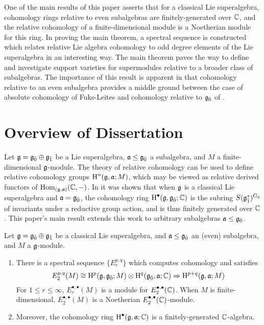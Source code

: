 One of the main results of this paper asserts that for a classical Lie superalgebra, cohomology rings relative to even subalgebras are finitely-generated over $\mathbb{C}$, and the relative cohomology of a finite-dimensional module is a Noetherian module for this ring. In proving the main theorem, a spectral sequence is constructed  which relates relative Lie algebra cohomology to odd degree elements of the Lie superalgebra in an interesting way. The main theorem paves the way to define and investigate support varieties for supermodules relative to a broader class of subalgebras. The importance of this result is apparent in that cohomology relative to an even subalgebra provides a middle ground between the case of absolute cohomology of Fuks-Leites and cohomology relative to ${\mathfrak{g}}_{\bar{0}}$ of \cite{BKN-1}.

\section{Overview of Dissertation}
\label{sec:overview}


Let $\mathfrak{g} = {\mathfrak{g}}_{\bar{0}} \oplus {\mathfrak{g}}_{\bar{1}}$ be a Lie superalgebra, $\mathfrak{a} \leq {\mathfrak{g}}_{\bar{0}}$ a subalgebra, and $M$ a finite-dimensional $\mathfrak{g}$-module. The theory of relative cohomology \cite{hochschild} can be used to define relative cohomology groups $\operatorname{H}^n(\mathfrak{g},\mathfrak{a};M)$, which may be viewed as relative derived functors of $\operatorname{Hom}_{(\mathfrak{g},\mathfrak{a})}(\mathbb{C},-)$. In \cite[Theorem 2.5.2]{BKN-1} it was shown that when $\mathfrak{g}$ is a classical Lie superalgebra and $\mathfrak{a} = {\mathfrak{g}}_{\bar{0}}$, the cohomology ring $\operatorname{H}^\bullet(\mathfrak{g},{\mathfrak{g}}_{\bar{0}};\mathbb{C})$ is the subring $S({\mathfrak{g}}_{\bar{1}}^*)^{{G}_{\bar{0}}}$ of invariants under a reductive group action, and is thus finitely generated over $\mathbb{C}$. This paper's main result extends this work to arbitrary subalgebras $\mathfrak{a} \leq {\mathfrak{g}}_{\bar{0}}$.

\begin{maintheorem}
  Let $\mathfrak{g} = {\mathfrak{g}}_{\bar{0}} \oplus {\mathfrak{g}}_{\bar{1}}$ be a classical Lie superalgebra, and $\mathfrak{a} \leq {\mathfrak{g}}_{\bar{0}}$ an (even) subalgebra, and $M$ a $\mathfrak{g}$-module.
  \begin{enumerate}[\indent\rm (a)]
    \item There is a spectral sequence $\{E_r^{p,q}\}$ which computes cohomology and satisfies
  \[
    E_2^{p,q}(M) \cong \operatorname{H}^p(\mathfrak{g},{\mathfrak{g}}_{\bar{0}};M) \otimes \operatorname{H}^q({\mathfrak{g}}_{\bar{0}},\mathfrak{a};\mathbb{C}) \Rightarrow \operatorname{H}^{p+q}(\mathfrak{g},\mathfrak{a};M)
  \]
  For $1 \leq r \leq \infty$, $E_r^{\bullet,\bullet}(M)$ is a module for $E_2^{\bullet,\bullet}(\mathbb{C})$. When $M$ is finite-dimensional, $E_2^{\bullet,\bullet}(M)$ is a Noetherian $E_2^{\bullet,\bullet}(\mathbb{C})$-module.
    \item Moreover, the cohomology ring $\operatorname{H}^\bullet(\mathfrak{g},\mathfrak{a};\mathbb{C})$ is a finitely-generated $\mathbb{C}$-algebra.
  \end{enumerate}
\end{maintheorem}


